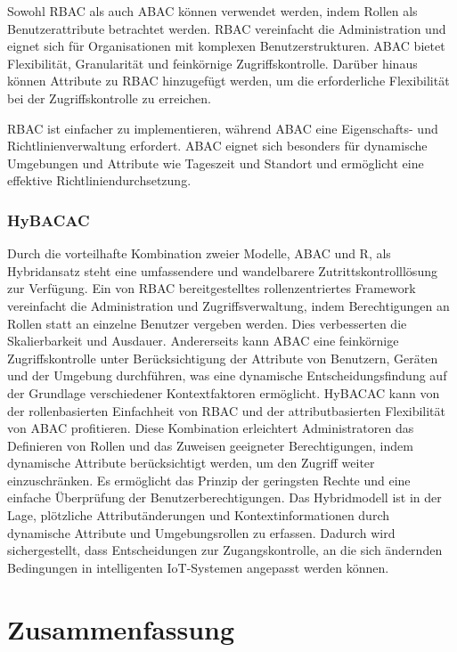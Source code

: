 Sowohl RBAC als auch ABAC können verwendet werden, indem Rollen als Benutzerattribute betrachtet werden. RBAC vereinfacht die Administration und eignet sich für Organisationen mit komplexen Benutzerstrukturen. ABAC bietet Flexibilität, Granularität und feinkörnige Zugriffskontrolle. Darüber hinaus können Attribute zu RBAC hinzugefügt werden, um die erforderliche Flexibilität bei der Zugriffskontrolle zu erreichen.

RBAC ist einfacher zu implementieren, während ABAC eine Eigenschafts- und Richtlinienverwaltung erfordert. ABAC eignet sich besonders für dynamische Umgebungen und Attribute wie Tageszeit und Standort und ermöglicht eine effektive Richtliniendurchsetzung\cite{coyne2013abac}\cite{ameer2022hybrid}.

\subsubsection{HyBACAC}
Durch die vorteilhafte Kombination zweier Modelle, ABAC und R, als Hybridansatz steht eine umfassendere und wandelbarere Zutrittskontrolllösung zur Verfügung.
Ein von RBAC bereitgestelltes rollenzentriertes Framework vereinfacht die Administration und Zugriffsverwaltung, indem Berechtigungen an Rollen statt an einzelne Benutzer vergeben werden. Dies verbesserten die Skalierbarkeit und Ausdauer.
Andererseits kann ABAC eine feinkörnige Zugriffskontrolle unter Berücksichtigung der Attribute von Benutzern, Geräten und der Umgebung durchführen, was eine dynamische Entscheidungsfindung auf der Grundlage verschiedener Kontextfaktoren ermöglicht.
HyBACAC kann von der rollenbasierten Einfachheit von RBAC und der attributbasierten Flexibilität von ABAC profitieren. Diese Kombination erleichtert Administratoren das Definieren von Rollen und das Zuweisen geeigneter Berechtigungen, indem dynamische Attribute berücksichtigt werden, um den Zugriff weiter einzuschränken.
Es ermöglicht das Prinzip der geringsten Rechte und eine einfache Überprüfung der Benutzerberechtigungen.
Das Hybridmodell ist in der Lage, plötzliche Attributänderungen und Kontextinformationen durch dynamische Attribute und Umgebungsrollen zu erfassen. Dadurch wird sichergestellt, dass Entscheidungen zur Zugangskontrolle, an die sich ändernden Bedingungen in intelligenten IoT-Systemen angepasst werden können\cite{ameer2022hybrid}.


\newpage


\newpage
\section{Zusammenfassung}

